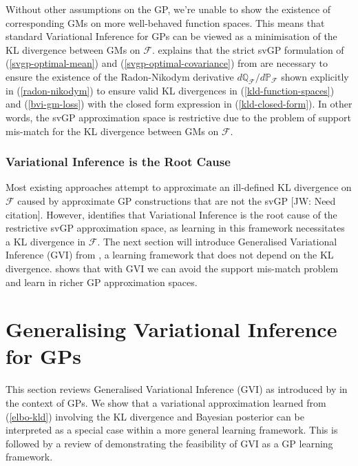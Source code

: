 \documentclass{article}
\newcommand{\jw}[1]{{\color{gray} [JW: #1]}}
\numberwithin{equation}{section}
\begin{document}
Without other assumptions on the GP, we're unable to show the existence of corresponding GMs on more well-behaved function spaces. This means that standard Variational Inference for GPs can be viewed as a minimisation of the KL divergence between GMs on $\mathcal{F}$. \cite{matthews2017scalable} explains that the strict svGP formulation of (\ref{svgp-optimal-mean}) and (\ref{svgp-optimal-covariance}) from \cite{titsias2009variational} are necessary to ensure the existence of the Radon-Nikodym derivative $d \mathbb{Q}_\mathcal{F}/d \mathbb{P}_\mathcal{F}$ shown explicitly in (\ref{radon-nikodym}) to ensure valid KL divergences in (\ref{kld-function-spaces}) and (\ref{bvi-gm-loss}) with the closed form expression in (\ref{kld-closed-form}). In other words, the svGP approximation space is restrictive due to the problem of support mis-match for the KL divergence between GMs on $\mathcal{F}$.

\subsubsection{Variational Inference is the Root Cause}
Most existing approaches attempt to approximate an ill-defined KL divergence on $\mathcal{F}$ caused by approximate GP constructions that are not the svGP \jw{Need citation}. However, \cite{wild2022generalized} identifies that Variational Inference is the root cause of the restrictive svGP approximation space, as learning in this framework necessitates a KL divergence in $\mathcal{F}$. The next section will introduce Generalised Variational Inference (GVI) from \cite{knoblauch2022optimization}, a learning framework that does not depend on the KL divergence. \cite{wild2022generalized} shows that with GVI we can avoid the support mis-match problem and learn in richer GP approximation spaces.

\newpage
\section{Generalising Variational Inference for GPs}
This section reviews Generalised Variational Inference (GVI) as introduced by \cite{knoblauch2022optimization} in the context of GPs. We show that a variational approximation learned from (\ref{elbo-kld}) involving the KL divergence and Bayesian posterior can be interpreted as a special case within a more general learning framework. This is followed by a review of \cite{wild2022generalized} demonstrating the feasibility of GVI as a GP learning framework.
\end{document}

